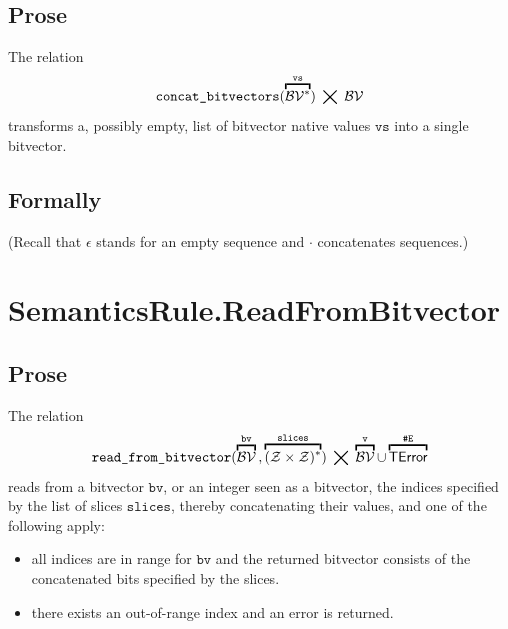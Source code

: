 \documentclass{book}
\newcommand\eqname[0]{\stackrel{\mathsmaller{\mathsf{is}}}{=}}
\newcommand\eqdef[0]{:=}
\newcommand\overname[2]{\overbracket{#1}^{#2}}
\newcommand\nvbitvector[0]{\texttt{Bitvector}}
\newcommand\tint[0]{\mathcal{Z}}
\newcommand\tbitvector[0]{\mathcal{B}\mathcal{V}}
\newcommand\evalarrow[0]{\stackrel{\mathsf{asl}}{\rightsquigarrow}}
\newcommand\aslrel[0]{\bigtimes}
\newcommand\aslsep[0]{\mathbf{,}}
\newcommand\ErrorConfig[0]{\texttt{\#E}}
\newcommand\TError[0]{\textsf{TError}}
\newcommand\vv[0]{\texttt{v}}
\newcommand\vvs[0]{\texttt{vs}}
\newcommand\vres[0]{\texttt{res}}
\newcommand\slices[0]{\texttt{slices}}
\newcommand\bv[0]{\texttt{bv}}
\begin{document}
\subsection{Prose}
The relation
\[
  \concatbitvectors(\overname{\tbitvector^*}{\vvs}) \;\aslrel\; \tbitvector
\]
transforms a, possibly empty, list of bitvector native values $\vvs$ into a single bitvector.

\begin{emptyformal}
\subsection{Formally}
(Recall that $\epsilon$ stands for an empty sequence and $\cdot$ concatenates sequences.)
\end{emptyformal}

\section{SemanticsRule.ReadFromBitvector \label{sec:SemanticsRule.ReadFromBitvector}}
\subsection{Prose}
The relation
\[
  \readfrombitvector(\overname{\tbitvector}{\bv} \aslsep \overname{(\tint\times\tint)^*}{\slices}) \;\aslrel\;
  \overname{\tbitvector}{\vv} \cup \overname{\TError}{\ErrorConfig}
\]
reads from a bitvector $\bv$, or an integer seen as a bitvector, the indices specified by the list of slices $\slices$,
thereby concatenating their values,
and one of the following apply:
\begin{itemize}
  \item all indices are in range for $\bv$ and the returned bitvector consists of the concatenated bits specified
  by the slices.
  \item there exists an out-of-range index and an error is returned.
\end{itemize}
\end{document}
